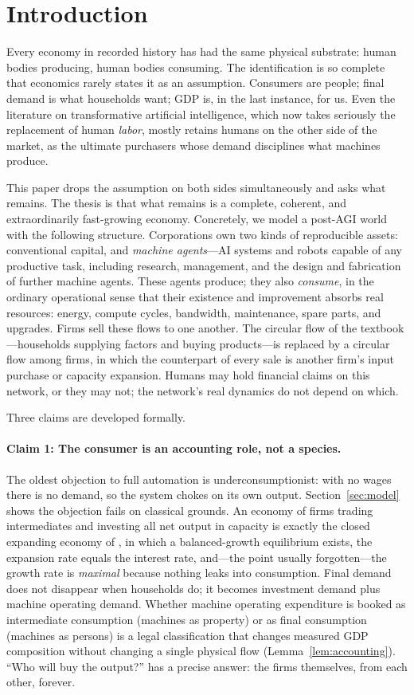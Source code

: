 \documentclass[11pt]{article}
\begin{document}
\section{Introduction}\label{sec:intro}

Every economy in recorded history has had the same physical substrate: human bodies producing, human bodies consuming. The identification is so complete that economics rarely states it as an assumption. Consumers are people; final demand is what households want; GDP is, in the last instance, for us. Even the literature on transformative artificial intelligence, which now takes seriously the replacement of human \emph{labor}, mostly retains humans on the other side of the market, as the ultimate purchasers whose demand disciplines what machines produce.

This paper drops the assumption on both sides simultaneously and asks what remains. The thesis is that what remains is a complete, coherent, and extraordinarily fast-growing economy. Concretely, we model a post-AGI world with the following structure. Corporations own two kinds of reproducible assets: conventional capital, and \emph{machine agents}---AI systems and robots capable of any productive task, including research, management, and the design and fabrication of further machine agents. These agents produce; they also \emph{consume}, in the ordinary operational sense that their existence and improvement absorbs real resources: energy, compute cycles, bandwidth, maintenance, spare parts, and upgrades. Firms sell these flows to one another. The circular flow of the textbook---households supplying factors and buying products---is replaced by a circular flow among firms, in which the counterpart of every sale is another firm's input purchase or capacity expansion. Humans may hold financial claims on this network, or they may not; the network's real dynamics do not depend on which.

Three claims are developed formally.

\paragraph{Claim 1: The consumer is an accounting role, not a species.} The oldest objection to full automation is underconsumptionist: with no wages there is no demand, so the system chokes on its own output. Section~\ref{sec:model} shows the objection fails on classical grounds. An economy of firms trading intermediates and investing all net output in capacity is exactly the closed expanding economy of \citet{vonneumann1945}, in which a balanced-growth equilibrium exists, the expansion rate equals the interest rate, and---the point usually forgotten---the growth rate is \emph{maximal} because nothing leaks into consumption. Final demand does not disappear when households do; it becomes investment demand plus machine operating demand. Whether machine operating expenditure is booked as intermediate consumption (machines as property) or as final consumption (machines as persons) is a legal classification that changes measured GDP composition without changing a single physical flow (Lemma~\ref{lem:accounting}). ``Who will buy the output?'' has a precise answer: the firms themselves, from each other, forever.
\end{document}
